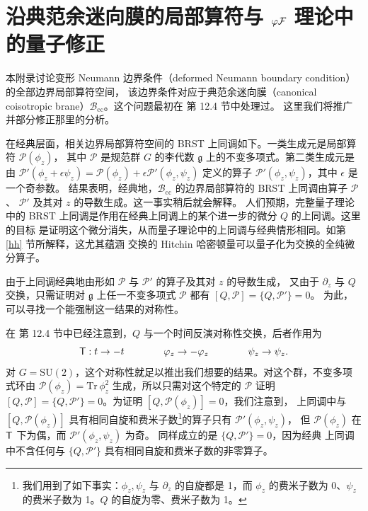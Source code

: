 
\appendix


\section{沿典范余迷向膜的局部算符与 $\varphi {\cal F}$ 理论中的量子修正}\label{coho}
本附录讨论变形 Neumann 边界条件（deformed Neumann boundary condition）的全部边界局部算符空间，
该边界条件对应于典范余迷向膜（canonical coisotropic brane）${\mathcal B}_{\mathrm{cc}}$。这个问题最初在 \cite{KW} 第 12.4 节中处理过。
这里我们将推广并部分修正那里的分析。

在经典层面，相关边界局部算符空间的 BRST 上同调如下。一类生成元是局部算符 ${\mathcal P}(\phi_z)$，
其中 ${\mathcal P}$ 是规范群 $G$ 的李代数 $\mathfrak g$ 上的不变多项式。第二类生成元是由
${\mathcal P}'(\phi_z+\epsilon\psi_z)={\mathcal P}(\phi_z)+\epsilon {\mathcal P}'(\phi_z,\psi_z)$ 定义的算子
${\mathcal P}'(\phi_z,\psi_z)$，其中 $\epsilon$ 是一个奇参数。
结果表明，经典地，${\mathcal B}_{\mathrm{cc}}$ 的边界局部算符的 BRST 上同调由算子 ${\mathcal P}$、
${\mathcal P}'$ 及其对 $z$ 的导数生成。这一事实稍后就会解释。
人们预期，完整量子理论中的 BRST 上同调是作用在经典上同调上的某个进一步的微分 $Q$ 的上同调。这里的目标
是证明这个微分消失，从而量子理论中的上同调与经典情形相同。如第 \ref{hh} 节所解释，这尤其蕴涵
交换的 Hitchin 哈密顿量可以量子化为交换的全纯微分算子。

由于上同调经典地由形如 $\mathcal P$ 与 $\mathcal P'$ 的算子及其对 $z$ 的导数生成，
又由于 $\partial_z$ 与 $Q$ 交换，只需证明对 $\mathfrak g$ 上任一不变多项式 $\mathcal P$ 都有 $[Q,\mathcal P]=\{Q,\mathcal P'\}=0$。
为此，可以寻找一个能强制这一结果的对称性。

在 \cite{KW} 第 12.4 节中已经注意到，$Q$ 与一个时间反演对称性交换，后者作用为
\begin{equation}\label{tadd}
{\sf T}: t \to - t \qquad \qquad \varphi_z \to - \varphi_z \qquad \qquad \psi_z \to \psi_z.
\end{equation}
对 $G=\mathrm{SU}(2)$，这个对称性就足以推出我们想要的结果。对这个群，不变多项式环由 $\mathcal P(\phi_z)={\mathrm{Tr}}\,
\phi_z^2$ 生成，所以只需对这个特定的 $\mathcal P$ 证明 $[Q,\mathcal P]=\{Q,\mathcal P'\}=0$。为证明 $[Q,\mathcal P(\phi_z)]=0$，我们注意到，
上同调中与 $[Q,\mathcal P(\phi_z)]$ 具有相同自旋和费米子数\footnote{我们用到了如下事实：$\phi_z,\psi_z$ 与 $\partial_z$ 的自旋都是 1，而
$\phi_z$ 的费米子数为 0、$\psi_z$ 的费米子数为 1。$Q$ 的自旋为零、费米子数为 1。}的算子只有 $\mathcal P'(\phi_z,\psi_z)$，
但 $\mathcal P(\phi_z)$ 在 $\sf T$ 下为偶，而 ${\mathcal P}'(\phi_z,\psi
_z)$ 为奇。
同样成立的是 $\{Q,\mathcal P'\}=0$，因为经典
上同调中不含任何与 $\{Q,\mathcal P'\}$ 具有相同自旋和费米子数的非零算子。

